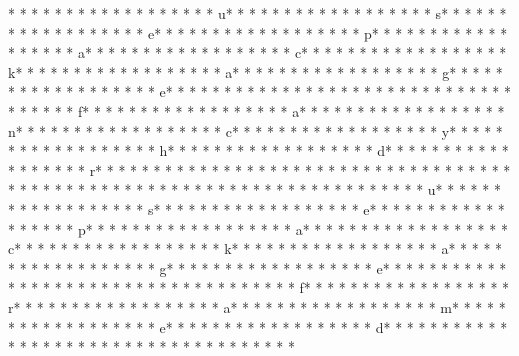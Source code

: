 * * *  * * *  * * *  *  * * *  *  * * *  * u* * *  * * *  * * *  *  * * *  *  * * *  * s* * *  * * *  * * *  *  * * *  *  * * *  * e* * *  * * *  * * *  *  * * *  *  * * *  * p* * *  * * *  * * *  *  * * *  *  * * *  * a* * *  * * *  * * *  *  * * *  *  * * *  * c* * *  * * *  * * *  *  * * *  *  * * *  * k* * *  * * *  * * *  *  * * *  *  * * *  * a* * *  * * *  * * *  *  * * *  *  * * *  * g* * *  * * *  * * *  *  * * *  *  * * *  * e* * *  * * *  * * *  *  * * *  *  * * *  * {* * *  * * *  * * *  *  * * *  *  * * *  * f* * *  * * *  * * *  *  * * *  *  * * *  * a* * *  * * *  * * *  *  * * *  *  * * *  * n* * *  * * *  * * *  *  * * *  *  * * *  * c* * *  * * *  * * *  *  * * *  *  * * *  * y* * *  * * *  * * *  *  * * *  *  * * *  * h* * *  * * *  * * *  *  * * *  *  * * *  * d* * *  * * *  * * *  *  * * *  *  * * *  * r* * *  * * *  * * *  *  * * *  *  * * *  * }* * *  * * *  * * *  *  * * *  *  * * *  * 
* * *  * * *  * * *  *  * * *  *  * * *  * %
* * *  * * *  * * *  *  * * *  *  * * *  * u* * *  * * *  * * *  *  * * *  *  * * *  * s* * *  * * *  * * *  *  * * *  *  * * *  * e* * *  * * *  * * *  *  * * *  *  * * *  * p* * *  * * *  * * *  *  * * *  *  * * *  * a* * *  * * *  * * *  *  * * *  *  * * *  * c* * *  * * *  * * *  *  * * *  *  * * *  * k* * *  * * *  * * *  *  * * *  *  * * *  * a* * *  * * *  * * *  *  * * *  *  * * *  * g* * *  * * *  * * *  *  * * *  *  * * *  * e* * *  * * *  * * *  *  * * *  *  * * *  * {* * *  * * *  * * *  *  * * *  *  * * *  * f* * *  * * *  * * *  *  * * *  *  * * *  * r* * *  * * *  * * *  *  * * *  *  * * *  * a* * *  * * *  * * *  *  * * *  *  * * *  * m* * *  * * *  * * *  *  * * *  *  * * *  * e* * *  * * *  * * *  *  * * *  *  * * *  * d* * *  * * *  * * *  *  * * *  *  * * *  * }* * *  * * *  * * *  *  * * *  *  * * *  * 
